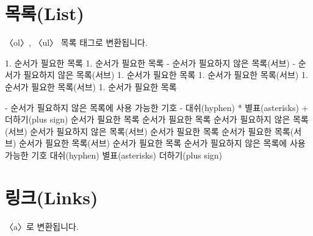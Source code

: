 \documentclass[12pt, a4paper, oneside]{book}
\let\stdsection\section
\renewcommand\section{\newpage\stdsection}
\begin{document}
				\section{목록(List)}
					
					〈ol〉, 〈ul〉 목록 태그로 변환됩니다.
					
					1. 순서가 필요한 목록
					1. 순서가 필요한 목록
					  - 순서가 필요하지 않은 목록(서브) 
					  - 순서가 필요하지 않은 목록(서브) 
					1. 순서가 필요한 목록
					  1. 순서가 필요한 목록(서브)
					  1. 순서가 필요한 목록(서브)
					1. 순서가 필요한 목록
					
					- 순서가 필요하지 않은 목록에 사용 가능한 기호
					  - 대쉬(hyphen)
					  * 별표(asterisks)
					  + 더하기(plus sign)
					순서가 필요한 목록
					순서가 필요한 목록
					순서가 필요하지 않은 목록(서브)
					순서가 필요하지 않은 목록(서브)
					순서가 필요한 목록
					순서가 필요한 목록(서브)
					순서가 필요한 목록(서브)
					순서가 필요한 목록
					순서가 필요하지 않은 목록에 사용 가능한 기호
					대쉬(hyphen)
					별표(asterisks)
					더하기(plus sign)
			
				\section{링크(Links)}
					
					〈a〉로 변환됩니다.
					
					
%					
%					
					
%					
%					
%					
%					
%					
%					
			
\end{document}
